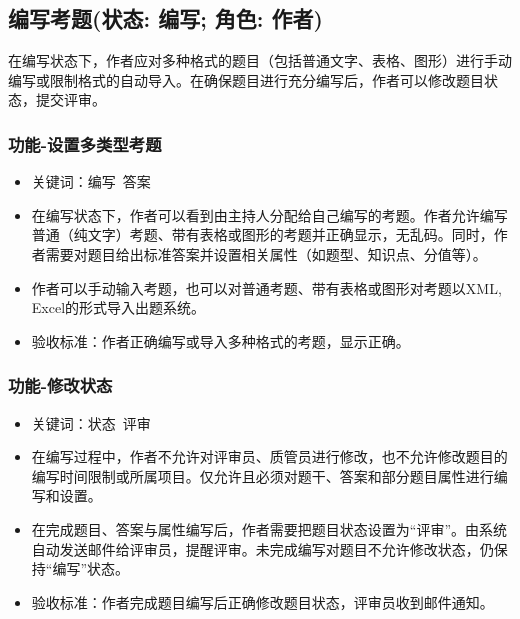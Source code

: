 \documentclass[hyperref, a4paper]{ctexart}
\providecommand{\tightlist}{%
  \setlength{\itemsep}{0pt}\setlength{\parskip}{0pt}}
\begin{document}
\hypertarget{ux7f16ux5199ux8003ux9898ux72b6ux6001-ux7f16ux5199-ux89d2ux8272-ux4f5cux8005}{%
\subsection{编写考题(状态: 编写; 角色:
作者)}\label{ux7f16ux5199ux8003ux9898ux72b6ux6001-ux7f16ux5199-ux89d2ux8272-ux4f5cux8005}}

在编写状态下，作者应对多种格式的题目（包括普通文字、表格、图形）进行手动编写或限制格式的自动导入。在确保题目进行充分编写后，作者可以修改题目状态，提交评审。

\hypertarget{ux529fux80fd-ux8bbeux7f6eux591aux7c7bux578bux8003ux9898}{%
\subsubsection{功能-设置多类型考题}\label{ux529fux80fd-ux8bbeux7f6eux591aux7c7bux578bux8003ux9898}}

\begin{itemize}
\tightlist
\item
  关键词：编写~答案
\item
  在编写状态下，作者可以看到由主持人分配给自己编写的考题。作者允许编写普通（纯文字）考题、带有表格或图形的考题并正确显示，无乱码。同时，作者需要对题目给出标准答案并设置相关属性（如题型、知识点、分值等）。
\item
  作者可以手动输入考题，也可以对普通考题、带有表格或图形对考题以XML,
  Excel的形式导入出题系统。
\item
  验收标准：作者正确编写或导入多种格式的考题，显示正确。
\end{itemize}

\hypertarget{ux529fux80fd-ux4feeux6539ux72b6ux6001-1}{%
\subsubsection{功能-修改状态}\label{ux529fux80fd-ux4feeux6539ux72b6ux6001-1}}

\begin{itemize}
\tightlist
\item
  关键词：状态~评审
\item
  在编写过程中，作者不允许对评审员、质管员进行修改，也不允许修改题目的编写时间限制或所属项目。仅允许且必须对题干、答案和部分题目属性进行编写和设置。
\item
  在完成题目、答案与属性编写后，作者需要把题目状态设置为``评审''。由系统自动发送邮件给评审员，提醒评审。未完成编写对题目不允许修改状态，仍保持``编写''状态。
\item
  验收标准：作者完成题目编写后正确修改题目状态，评审员收到邮件通知。
\end{itemize}
\end{document}
